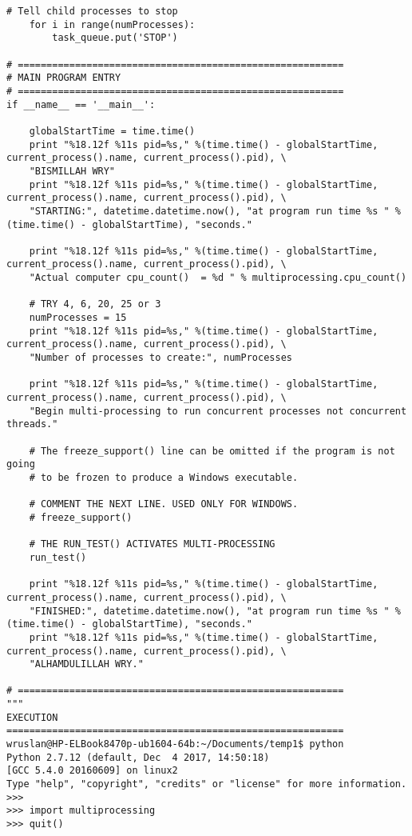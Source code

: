 \begin{lstlisting}[caption={App4-Python Parallel Multiprocessing Codes}, label=App4-Python Parallel Multiprocessing Codes]
	# Tell child processes to stop
	for i in range(numProcesses):
		task_queue.put('STOP')

# =========================================================
# MAIN PROGRAM ENTRY
# =========================================================
if __name__ == '__main__':

	globalStartTime = time.time() 
	print "%18.12f %11s pid=%s," %(time.time() - globalStartTime, current_process().name, current_process().pid), \
	"BISMILLAH WRY"
	print "%18.12f %11s pid=%s," %(time.time() - globalStartTime, current_process().name, current_process().pid), \
	"STARTING:", datetime.datetime.now(), "at program run time %s " %(time.time() - globalStartTime), "seconds."
	
	print "%18.12f %11s pid=%s," %(time.time() - globalStartTime, current_process().name, current_process().pid), \
	"Actual computer cpu_count()  = %d " % multiprocessing.cpu_count()
	
	# TRY 4, 6, 20, 25 or 3
	numProcesses = 15
	print "%18.12f %11s pid=%s," %(time.time() - globalStartTime, current_process().name, current_process().pid), \
	"Number of processes to create:", numProcesses
	
	print "%18.12f %11s pid=%s," %(time.time() - globalStartTime, current_process().name, current_process().pid), \
	"Begin multi-processing to run concurrent processes not concurrent threads."

	# The freeze_support() line can be omitted if the program is not going 
	# to be frozen to produce a Windows executable.
	
	# COMMENT THE NEXT LINE. USED ONLY FOR WINDOWS.
	# freeze_support()
	
	# THE RUN_TEST() ACTIVATES MULTI-PROCESSING
	run_test()
	
	print "%18.12f %11s pid=%s," %(time.time() - globalStartTime, current_process().name, current_process().pid), \
	"FINISHED:", datetime.datetime.now(), "at program run time %s " %(time.time() - globalStartTime), "seconds."
	print "%18.12f %11s pid=%s," %(time.time() - globalStartTime, current_process().name, current_process().pid), \
	"ALHAMDULILLAH WRY."

# =========================================================
"""
EXECUTION
===========================================================
wruslan@HP-ELBook8470p-ub1604-64b:~/Documents/temp1$ python
Python 2.7.12 (default, Dec  4 2017, 14:50:18) 
[GCC 5.4.0 20160609] on linux2
Type "help", "copyright", "credits" or "license" for more information.
>>> 
>>> import multiprocessing
>>> quit()


\end{lstlisting}
